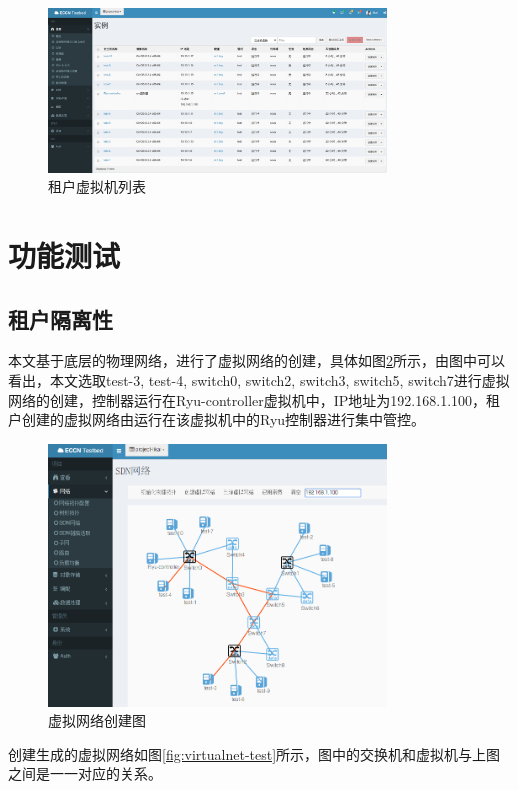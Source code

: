 \begin{figure}[!htb]
  \centering
  \includegraphics[width=0.8\textwidth]{logo/allhosts.png}
  \caption{租户虚拟机列表}
  \label{fig:allhosts}
\end{figure}
\section{功能测试}
\subsection{租户隔离性}
本文基于底层的物理网络，进行了虚拟网络的创建，具体如图\ref{fig:create-virtual}所示，由图中可以看出，本文选取test-3, test-4, switch0, switch2, switch3, switch5, switch7进行虚拟网络的创建，控制器运行在Ryu-controller虚拟机中，IP地址为192.168.1.100，租户创建的虚拟网络由运行在该虚拟机中的Ryu控制器进行集中管控。

\begin{figure}[!htb]
  \centering
  \includegraphics[width=0.8\textwidth,height=0.50\textwidth]{logo/create-virtual.png}
  \caption{虚拟网络创建图}
  \label{fig:create-virtual}
\end{figure}

创建生成的虚拟网络如图\ref{fig:virtualnet-test}所示，图中的交换机和虚拟机与上图之间是一一对应的关系。

